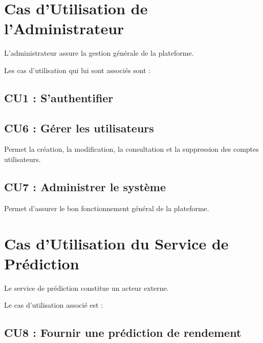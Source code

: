 \hypertarget{cas-dutilisation-de-ladministrateur}{%
\section{Cas d'Utilisation de
l'Administrateur}\label{cas-dutilisation-de-ladministrateur}}

L'administrateur assure la gestion générale de la plateforme.

Les cas d'utilisation qui lui sont associés sont :

\hypertarget{cu1-sauthentifier-2}{%
\subsection{CU1 : S'authentifier}\label{cu1-sauthentifier-2}}

\hypertarget{cu6-guxe9rer-les-utilisateurs}{%
\subsection{CU6 : Gérer les
utilisateurs}\label{cu6-guxe9rer-les-utilisateurs}}

Permet la création, la modification, la consultation et la suppression
des comptes utilisateurs.

\hypertarget{cu7-administrer-le-systuxe8me}{%
\subsection{CU7 : Administrer le
système}\label{cu7-administrer-le-systuxe8me}}

Permet d'assurer le bon fonctionnement général de la plateforme.

\hypertarget{cas-dutilisation-du-service-de-pruxe9diction}{%
\section{Cas d'Utilisation du Service de
Prédiction}\label{cas-dutilisation-du-service-de-pruxe9diction}}

Le service de prédiction constitue un acteur externe.

Le cas d'utilisation associé est :

\hypertarget{cu8-fournir-une-pruxe9diction-de-rendement}{%
\subsection{CU8 : Fournir une prédiction de
rendement}\label{cu8-fournir-une-pruxe9diction-de-rendement}}

